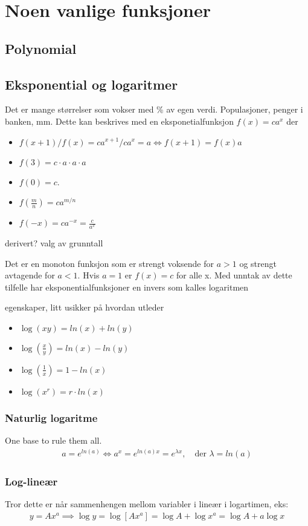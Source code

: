 \section{Noen vanlige funksjoner}
\subsection{Polynomial}
\subsection{Eksponential og logaritmer}
Det er mange størrelser som vokser med \% av egen verdi. Populasjoner, penger i banken, mm. Dette kan beskrives med en eksponetialfunksjon $f(x)=ca^x$ der 
\begin{itemize}
\item$f(x+1)/f(x) = ca^{x+1}/ca^x = a \iff f(x+1)=f(x)a$ 
\item $f(3)=c\cdot a \cdot a \cdot a$ 
\item $f(0)=c$. 
\item $f(\frac{m}{n}) = ca^{m/n}$
\item $f(-x) = ca^{-x}=\frac{c}{a^x}$
\end{itemize}
derivert? valg av grunntall

Det er en monoton funksjon som er strengt voksende for $a>1$ og strengt avtagende for $a<1$. Hvis $a=1$ er $f(x)=c$ for alle x. Med unntak av dette tilfelle har eksponentialfunksjoner en invers som kalles logaritmen

egenskaper, litt usikker på hvordan utleder
\begin{itemize}
\item $\log(xy)=ln(x)+ln(y)$
\item $\log(\frac{x}{y})=ln(x)-ln(y)$
\item $\log(\frac{1}{x})=1-ln(x)$
\item $\log(x^r) = r \cdot ln(x)$
\end{itemize}
\subsubsection{Naturlig logaritme}
One base to rule them all.
\begin{align}
a = e^{ln(a)} \iff a^x = e^{ln(a)x} = e^{\lambda x}, \quad \text{der } \lambda =ln(a)
\end{align}
\subsubsection{Log-lineær}
Tror dette er når sammenhengen mellom variabler i lineær i logartimen, eks:
\begin{align}
y = Ax^a \implies \log y = \log [Ax^a] = \log A + \log x^a = \log A + a \log x
\end{align}
